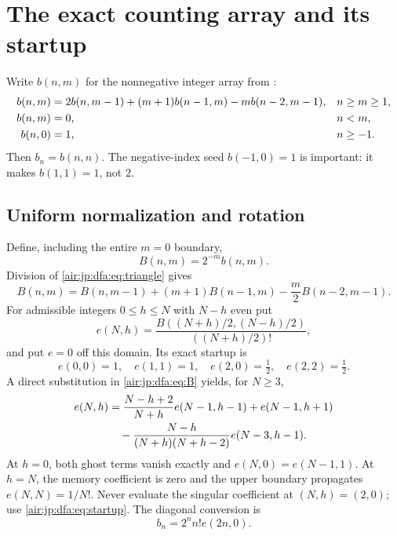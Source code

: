 \documentclass[11pt,letterpaper]{article}
\numberwithin{equation}{section}
\theoremstyle{remark}
\begin{document}
\section{The exact counting array and its startup}\label{air:jp:dfa:sec:exact}
Write $b(n,m)$ for the nonnegative integer array from \cite[Proposition 5]{dfa}:
\begin{align}
 b(n,m)&=2b(n,m-1)+(m+1)b(n-1,m)-m b(n-2,m-1),
       &&n\ge m\ge1,\label{air:jp:dfa:eq:triangle}\\
 b(n,m)&=0,&&n<m,\notag\\
 b(n,0)&=1,&&n\ge-1.\notag
\end{align}
Then $b_n=b(n,n)$. The negative-index seed $b(-1,0)=1$ is important: it makes $b(1,1)=1$, not $2$.

\subsection{Uniform normalization and rotation}
Define, including the entire $m=0$ boundary,
\[
 B(n,m)=2^{-m}b(n,m).
\]
Division of \eqref{air:jp:dfa:eq:triangle} gives
\begin{equation}\label{air:jp:dfa:eq:B}
 B(n,m)=B(n,m-1)+(m+1)B(n-1,m)-\frac m2B(n-2,m-1).
\end{equation}
For admissible integers $0\le h\le N$ with $N-h$ even put
\[
 e(N,h)=\frac{B((N+h)/2,(N-h)/2)}{((N+h)/2)!},
\]
and put $e=0$ off this domain. Its exact startup is
\begin{equation}\label{air:jp:dfa:eq:startup}
 e(0,0)=1,\quad e(1,1)=1,\quad e(2,0)=\tfrac12,\quad e(2,2)=\tfrac12.
\end{equation}
A direct substitution in \eqref{air:jp:dfa:eq:B} yields, for $N\ge3$,
\begin{align}
 e(N,h)&=\frac{N-h+2}{N+h}e(N-1,h-1)+e(N-1,h+1)\notag\\
 &\quad-\frac{N-h}{(N+h)(N+h-2)}e(N-3,h-1).\label{air:jp:dfa:eq:walk}
\end{align}
At $h=0$, both ghost terms vanish exactly and $e(N,0)=e(N-1,1)$. At $h=N$, the memory coefficient is zero and the upper boundary propagates $e(N,N)=1/N!$. Never evaluate the singular coefficient at $(N,h)=(2,0)$; use \eqref{air:jp:dfa:eq:startup}. The diagonal conversion is
\begin{equation}\label{air:jp:dfa:eq:diagonal}
 b_n=2^n n!e(2n,0).
\end{equation}
\end{document}
